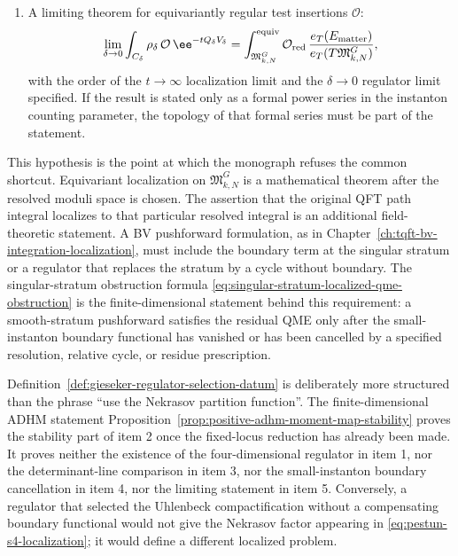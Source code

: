 \begin{definition}
\begin{enumerate}
  smooth-stratum pushforward and the Gieseker-resolved pushforward.  Thus
  the resolution is part of the BV pushforward structure, not an informal
  replacement made after the path integral has already been localized.
  \item A limiting theorem for equivariantly regular test insertions
  \(\mathcal O\):
  \[
    \lim_{\delta\to0}
    \int_{C_\delta}\rho_\delta\,\mathcal O\,\ee^{-tQ_\delta V_\delta}
    =
    \int_{\mathfrak M_{k,N}^{G}}^{\rm equiv}
    \mathcal O_{\rm red}\,
    \frac{e_T(E_{\rm matter})}{e_T(T\mathfrak M_{k,N}^{G})},
  \]
  with the order of the \(t\to\infty\) localization limit and the
  \(\delta\to0\) regulator limit specified.  If the result is stated only as
  a formal power series in the instanton counting parameter, the topology of
  that formal series must be part of the statement.
\end{enumerate}
\end{definition}

This hypothesis is the point at which the monograph refuses the common
shortcut.  Equivariant localization on \(\mathfrak M_{k,N}^{G}\) is a
mathematical theorem after the resolved moduli space is chosen.  The
assertion that the original QFT path integral localizes to that particular
resolved integral is an additional field-theoretic statement.  A BV
pushforward formulation, as in
Chapter~\ref{ch:tqft-bv-integration-localization}, must include the boundary
term at the singular stratum or a regulator that replaces the stratum by a
cycle without boundary.  The singular-stratum obstruction formula
\eqref{eq:singular-stratum-localized-qme-obstruction} is the
finite-dimensional statement behind this requirement: a smooth-stratum
pushforward satisfies the residual QME only after the small-instanton boundary
functional has vanished or has been cancelled by a specified resolution,
relative cycle, or residue prescription.

Definition~\ref{def:gieseker-regulator-selection-datum} is deliberately more
structured than the phrase ``use the Nekrasov partition function''.  The
finite-dimensional ADHM statement
Proposition~\ref{prop:positive-adhm-moment-map-stability} proves the
stability part of item 2 once the fixed-locus reduction has already been
made.  It proves neither the existence of the four-dimensional regulator in
item 1, nor the determinant-line comparison in item 3, nor the
small-instanton boundary cancellation in item 4, nor the limiting statement
in item 5.  Conversely, a regulator that selected the Uhlenbeck
compactification without a compensating boundary functional would not give
the Nekrasov factor appearing in \eqref{eq:pestun-s4-localization}; it would
define a different localized problem.

